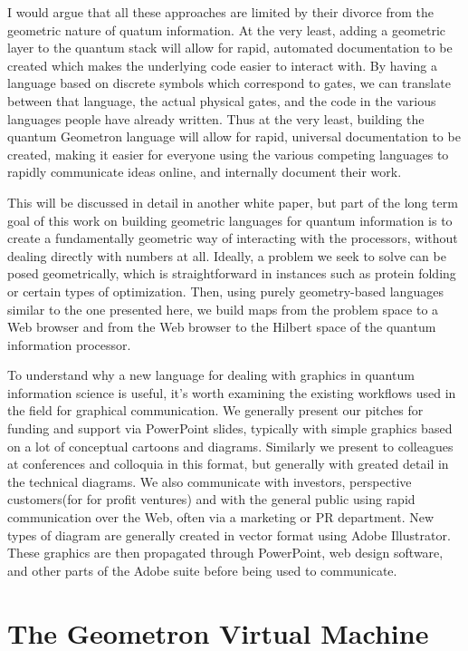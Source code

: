 \documentclass[11pt]{article}
\begin{document}
    I would argue that all these approaches are limited by their divorce from the geometric nature of quatum information.  At the very least, adding a geometric layer to the quantum stack will allow for rapid, automated documentation to be created which makes the underlying code easier to interact with.  By having a language based on discrete symbols which correspond to gates, we can translate between that language, the actual physical gates, and the code in the various languages people have already written.  Thus at the very least, building the quantum Geometron language will allow for rapid, universal documentation to be created, making it easier for everyone using the various competing languages to rapidly communicate ideas online, and internally document their work.  


    This will be discussed in detail in another white paper, but part of the long term goal of this work on building geometric languages for quantum information is to create a fundamentally geometric way of interacting with the processors, without dealing directly with numbers at all.  Ideally, a problem we seek to solve can be posed geometrically, which is straightforward in instances such as protein folding or certain types of optimization. Then, using purely geometry-based languages similar to the one presented here, we build maps from the problem space to a Web browser and from the Web browser to the Hilbert space of the quantum information processor.  


    To understand why a new language for dealing with graphics in quantum information science is useful, it's worth examining the existing workflows used in the field for graphical communication.  We generally present our pitches for funding and support via PowerPoint slides, typically with simple graphics based on a lot of conceptual cartoons and diagrams.  Similarly we present to colleagues at conferences and colloquia in this format, but generally with greated detail in the technical diagrams.  We also communicate with investors, perspective customers(for for profit ventures) and with the general public using rapid communication over the Web, often via a marketing or PR department.  New types of diagram are generally created in vector format using Adobe Illustrator.  These graphics are then propagated through PowerPoint, web design software, and other parts of the Adobe suite before being used to communicate.  




\section{The Geometron Virtual Machine}
\end{document}
